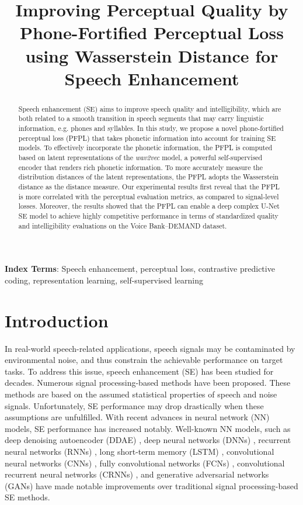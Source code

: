 \documentclass[a4paper]{article}
\title{Improving Perceptual Quality by Phone-Fortified Perceptual Loss using Wasserstein Distance for Speech Enhancement}
\begin{document}
\maketitle
\begin{abstract}
Speech enhancement (SE) aims to improve speech quality and intelligibility, which are both related to a smooth transition in speech segments that may carry linguistic information, e.g. phones and syllables. In this study, we propose a novel phone-fortified perceptual loss (PFPL) that takes phonetic information into account for training SE models. To effectively incorporate the phonetic information, the PFPL is computed based on latent representations of the \textit{wav2vec} model, a powerful self-supervised encoder that renders rich
phonetic information. To more accurately measure the distribution distances of the latent representations, the PFPL adopts the Wasserstein distance as the distance measure. Our experimental results first reveal that the PFPL is more correlated with the perceptual evaluation metrics, as compared to signal-level losses. Moreover, the results showed that the PFPL can enable a deep complex U-Net SE model to achieve highly competitive performance in terms of standardized quality and intelligibility evaluations on the Voice Bank--DEMAND dataset.
\end{abstract}
\noindent\textbf{Index Terms}: Speech enhancement, perceptual loss, contrastive predictive coding, representation learning, self-supervised learning

\section{Introduction}

In real-world speech-related applications, speech signals may be contaminated by environmental noise, and thus constrain the achievable performance on target tasks. To address this issue, speech enhancement (SE) has been studied for decades. Numerous signal processing-based methods \cite{boll1979suppression, lim1979enhancement, paliwal1987speech, loizou2013speech} have been proposed. 
These methods are based on the assumed statistical properties of speech and noise signals. Unfortunately, SE performance may drop drastically when these assumptions are unfulfilled.
With recent advances in neural network (NN) models, SE performance has increased notably. Well-known NN models, such as deep denoising autoencoder (DDAE) \cite{lu2013speech}, deep neural networks (DNNs) \cite{xu2014regression}, recurrent neural networks (RNNs) \cite{weninger2014single}, long short-term memory (LSTM) \cite{weninger2015speech}, convolutional neural networks (CNNs) \cite{zhao2018convolutional}, fully convolutional networks (FCNs) \cite{fu2018end, pandey2019tcnn}, convolutional recurrent neural networks (CRNNs) \cite{tan2018convolutional}, and generative adversarial networks (GANs) \cite{pascual2017segan, soni2018time, pandey2018adversarial, baby2019sergan, qin2018improved, su2020hifi, fu2019metricgan} have made notable improvements over traditional signal processing-based SE methods. \par
\end{document}
